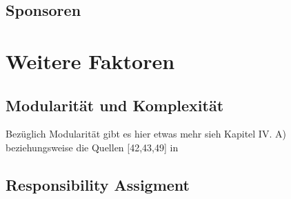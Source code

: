 \newpage

%
\newpage

\newpage


\subsection{Sponsoren}




\newpage
\section{Weitere Faktoren} \label{sec:Weitere Faktoren}





\subsection{Modularität und Komplexität}
Bezüglich Modularität gibt es hier etwas mehr \cite{marganSuccessOpenSource2015} sieh Kapitel IV. A)
beziehungsweise die Quellen [42,43,49] in \cite{marganSuccessOpenSource2015}

\subsection{Responsibility Assigment}

